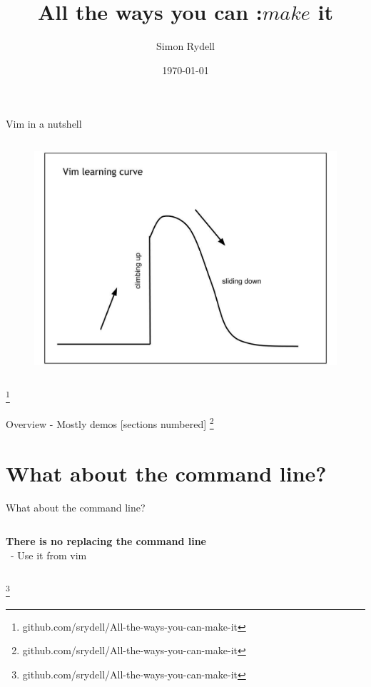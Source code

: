 \documentclass[12pt]{beamer}
\title{All the ways you can :$make$ it}
\date{\today}
\author{Simon Rydell}
\newcommand\blfootnote[1]{%
  \begingroup
  \renewcommand\thefootnote{}\footnote{#1}%
  \addtocounter{footnote}{-1}%
  \endgroup
}
\begin{document}
\begin{frame}
\titlepage
\end{frame}

% 
\begin{frame}{Vim in a nutshell}
    \begin{columns}[c]
        \column{4in}
            \begin{figure}[h!]
                \centering
                \includegraphics[width=.8\textwidth]{../figures/learingCurve.pdf}
            \end{figure}
    \end{columns}
    \blfootnote{github.com/srydell/All-the-ways-you-can-make-it}
\end{frame}

% 
\begin{frame}{Overview - Mostly demos}
    [sections numbered]
    \tableofcontents[hideallsubsections]
    \blfootnote{github.com/srydell/All-the-ways-you-can-make-it}
\end{frame}

\section{What about the command line?}

\begin{frame}{What about the command line?}
    \begin{columns}[c]
        \column{4in}
            \Large \textbf{There is no replacing the command line} \\
            \ - Use it from vim
    \end{columns}
    \blfootnote{github.com/srydell/All-the-ways-you-can-make-it}
\end{frame}
\end{document}
